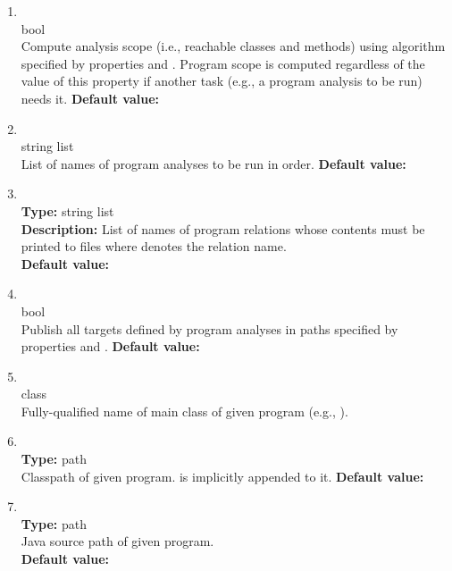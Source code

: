 \begin{enumerate}
\item
{} \\
 bool \\
 Compute analysis scope (i.e., reachable classes and methods)
using algorithm specified by properties  and .
Program scope is computed regardless of the value of this property if another task (e.g., a
program analysis to be run) needs it.
{\bf Default value:}  \\

\item
{} \\
 string list \\
 List of names of program analyses to be run
in order.
{\bf Default value:}  

\item
{} \\
{\bf Type:} string list \\
{\bf Description:} List of names of program relations whose contents must be printed to files  where  denotes the relation name.  \\
{\bf Default value:}  

\item
{} \\
 bool \\
 Publish all targets defined by program analyses in
paths specified by properties  and
.
{\bf Default value:}  \\

\item
{} \\
 class \\
 Fully-qualified name of main class of given program
(e.g., ). \\

\item
{} \\
{\bf Type:} path \\
 Classpath of given program. 
is implicitly appended to it.
{\bf Default value:}  

\item
{} \\
{\bf Type:} path \\
 Java source path of given program. \\
{\bf Default value:}  


\end{enumerate}
